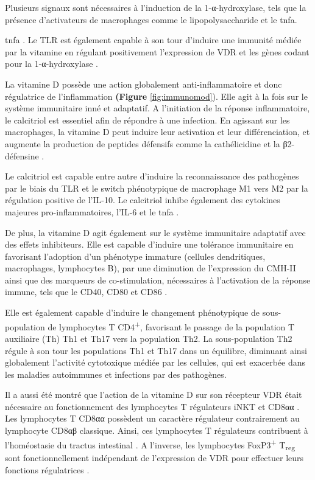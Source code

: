 \documentclass[
  a4paper,
  DIV=11,
  numbers=noendperiod,
  listof=totoc]{scrreprt}
\begin{document}
Plusieurs signaux sont nécessaires à l'induction de la 1-α-hydroxylase,
tels que la présence d'activateurs de macrophages comme le
lipopolysaccharide et le \ac{tnfa}.

\ac{tnfa} \autocite{Overbergh.2006}. Le \ac{TLR} est également capable à
son tour d'induire une immunité médiée par la vitamine en régulant
positivement l'expression de VDR et les gènes codant pour la
1-α-hydroxylase \autocite{Liu.2006}.

La vitamine D possède une action globalement anti-inflammatoire et donc
régulatrice de l'inflammation \textbf{(Figure} \ref{fig:immunomod}).
Elle agit à la fois sur le système immunitaire inné et adaptatif. A
l'initiation de la réponse inflammatoire, le calcitriol est essentiel
afin de répondre à une infection. En agissant sur les macrophages, la
vitamine D peut induire leur activation et leur différenciation, et
augmente la production de peptides défensifs comme la cathélicidine et
la β2-défensine \autocite{Caprio.2017}.

Le calcitriol est capable entre autre d'induire la reconnaissance des
pathogènes par le biais du TLR et le switch phénotypique de macrophage
M1 vers M2 par la régulation positive de l'\ac{IL-10}. Le calcitriol
inhibe également des cytokines majeures pro-inflammatoires, l'\ac{IL-6}
et le \ac{tnfa} \autocite{Meza-Meza.2020,Caprio.2017}.

De plus, la vitamine D agit également sur le système immunitaire
adaptatif avec des effets inhibiteurs. Elle est capable d'induire une
tolérance immunitaire en favorisant l'adoption d'un phénotype immature
(cellules dendritiques, macrophages, lymphocytes B), par une diminution
de l'expression du \ac{CMH-II} ainsi que des marqueurs de
co-stimulation, nécessaires à l'activation de la réponse immune, tels
que le CD40, CD80 et CD86 \autocite{Meza-Meza.2020,Caprio.2017}.

Elle est également capable d'induire le changement phénotypique de
sous-population de lymphocytes T CD4\textsuperscript{+}, favorisant le
passage de la population T auxiliaire (Th) Th1 et Th17 vers la
population Th2. La sous-population Th2 régule à son tour les populations
Th1 et Th17 dans un équilibre, diminuant ainsi globalement l'activité
cytotoxique médiée par les cellules, qui est exacerbée dans les maladies
autoimmunes et infections par des
pathogènes\autocite{Holick.2011,Meza-Meza.2020}.

Il a aussi été montré que l'action de la vitamine D sur son récepteur
VDR était nécessaire au fonctionnement des lymphocytes T régulateurs
iNKT et CD8αα \autocite{Cheroutre.2008}. Les lymphocytes T CD8αα
possèdent un caractère régulateur contrairement au lymphocyte CD8αβ
classique. Ainsi, ces lymphocytes T régulateurs contribuent à
l'homéostasie du tractus intestinal \autocite{Cantorna.2010}. A
l'inverse, les lymphocytes FoxP3\textsuperscript{+} T\textsubscript{reg}
sont fonctionnellement indépendant de l'expression de VDR pour effectuer
leurs fonctions régulatrices \autocite{Cantorna.2010}.
\end{document}
